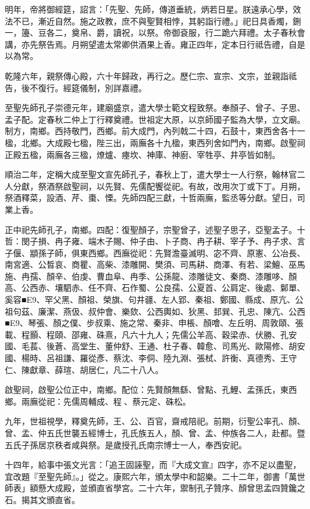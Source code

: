 \begin{pinyinscope}
明年，帝將御經筵，詔言：「先聖、先師，傳道垂統，炳若日星。朕遠承心學，效法不已，漸近自然。施之政教，庶不與聖賢相悖，其躬詣行禮。」祀日具香燭，鉶一，籩、豆各二，奠帛、爵，讀祝，以祭。帝御袞服，行二跪六拜禮。太子春秋會講，亦先祭告焉。月朔望遣太常卿供酒果上香。雍正四年，定本日行祗告禮，自是以為常。

乾隆六年，親祭傳心殿，六十年歸政，再行之。歷仁宗、宣宗、文宗，並親詣祗告，後不復行。經筵儀制，別詳嘉禮。

至聖先師孔子崇德元年，建廟盛京，遣大學士範文程致祭。奉顏子、曾子、子思、孟子配。定春秋二仲上丁行釋奠禮。世祖定大原，以京師國子監為大學，立文廟。制方，南鄉。西持敬門，西鄉。前大成門，內列戟二十四，石鼓十，東西舍各十一楹，北鄉。大成殿七楹，陛三出，兩廡各十九楹，東西列舍如門內，南鄉。啟聖祠正殿五楹，兩廡各三楹，燎爐、瘞坎、神庫、神廚、宰牲亭、井亭皆如制。

順治二年，定稱大成至聖文宣先師孔子，春秋上丁，遣大學士一人行祭，翰林官二人分獻，祭酒祭啟聖祠，以先賢、先儒配饗從祀。有故，改用次丁或下丁。月朔，祭酒釋菜，設酒、芹、棗、慄。先師四配三獻，十哲兩廡，監丞等分獻。望日，司業上香。

正中祀先師孔子，南鄉。四配：復聖顏子，宗聖曾子，述聖子思子，亞聖孟子。十哲：閔子損、冉子雍、端木子賜、仲子由、卜子商、冉子耕、宰子予、冉子求、言子偃、顓孫子師，俱東西鄉。西廡從祀：先賢澹臺滅明、宓不齊、原憲、公冶長、南宮適、公晳哀、商瞿、高柴、漆雕開、樊須、司馬耕、商澤、有若、梁鱣、巫馬施、冉孺、顏辛、伯虔、曹血阜、冉季、公孫龍、漆雕徒文、秦商、漆雕哆、顏高、公西赤、壤駟赤、任不齊、石作蜀、公良孺、公夏首、公肩定、後處、鄡單、奚容■E9、罕父黑、顏祖、榮旗、句井疆、左人郢、秦祖、鄭國、縣成、原亢、公祖句茲、廉潔、燕伋、叔仲會、樂欬、公西輿如、狄黑、邽巽、孔忠、陳亢、公西■E9、琴張、顏之僕、步叔乘、施之常、秦非、申棖、顏噲、左丘明、周敦頤、張載、程顥、程頤、邵雍、硃熹，凡六十九人；先儒公羊高、穀梁赤、伏勝、孔安國、毛萇、後蒼、高堂生、董仲舒、王通、杜子春、韓愈、司馬光、歐陽修、胡安國、楊時、呂祖謙、羅從彥、蔡沈、李侗、陸九淵、張栻、許衡、真德秀、王守仁、陳獻章、薛瑄、胡居仁，凡二十八人。

啟聖祠，啟聖公位正中，南鄉。配位：先賢顏無繇、曾點、孔鯉、孟孫氏，東西鄉。兩廡從祀：先儒周輔成、程、蔡元定、硃松。

九年，世祖視學，釋奠先師，王、公、百官，齋戒陪祀。前期，衍聖公率孔、顏、曾、孟、仲五氏世襲五經博士，孔氏族五人，顏、曾、孟、仲族各二人，赴都。暨五氏子孫居京秩者咸與祭。是歲授孔氏南宗博士一人，奉西安祀。

十四年，給事中張文光言：「追王固誣聖，而『大成文宣』四字，亦不足以盡聖，宜改題『至聖先師』。」從之。康熙六年，頒太學中和韶樂。二十二年，御書「萬世師表」額懸大成殿，並頒直省學宮。二十六年，禦制孔子贊序、顏曾思孟四贊鑱之石。揭其文頒直省。


\end{pinyinscope}

